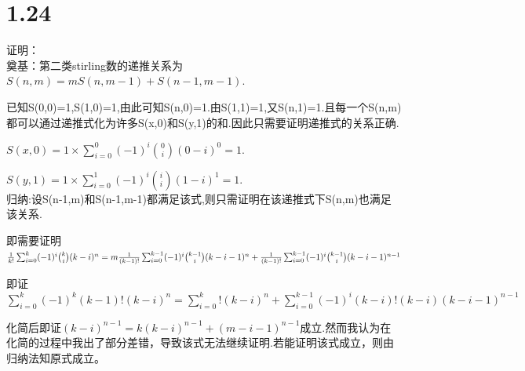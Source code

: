 \documentclass[12pt,a4paper]{ctexart}
\begin{document}
\section{1.24}
证明：\\
奠基：第二类stirling数的递推关系为$S(n,m)=mS(n,m-1)+S(n-1,m-1).$

已知S(0,0)=1,S(1,0)=1,由此可知S(n,0)=1.由S(1,1)=1,又S(n,1)=1.且每一个S(n,m)都可以通过递推式化为许多S(x,0)和S(y,1)的和.因此只需要证明递推式的关系正确.

$S(x,0)=1\times \sum_{i=0}^0(-1)^i\binom{0}{i}(0-i)^0=1.$

$S(y,1)=1\times \sum_{i=0}^1(-1)^i\binom{i}{i}(1-i)^1=1.$\\
归纳:设S(n-1,m)和S(n-1,m-1)都满足该式,则只需证明在该递推式下S(n,m)也满足该关系.

即需要证明$\frac{1}{k!}\sum_{i=0}^k(-1)^i\binom{k}{i}(k-i)^n=m\frac{1}{(k-1)!}\sum_{i=0}^{k-1}(-1)^i\binom{k-1}{i}(k-i-1)^n+\frac{1}{(k-1)!}\\\sum_{i=0}^{k-1}(-1)^i\binom{k-1}{i}(k-i-1)^{n-1}$

即证$\sum_{i=0}^k(-1)^k(k-1)!(k-i)^{n}=\sum_{i=0}^k!(k-i)^{n}+\sum_{i=0}^{k-1}(-1)^i(k-i)!(k-i)(k-i-1)^{n-1}$

化简后即证$(k-i)^{n-1}=k(k-i)^{n-1}+(m-i-1)^{n-1}$成立.然而我认为在化简的过程中我出了部分差错，导致该式无法继续证明.若能证明该式成立，则由归纳法知原式成立。
\end{document}
